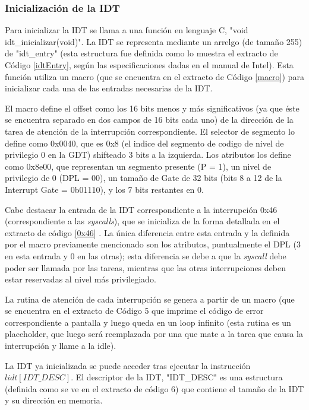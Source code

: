 \subsubsection*{Inicialización de la IDT}

\par Para inicializar la IDT se llama a una funci\'on en lenguaje C, "void idt\_inicializar(void)". La IDT se representa mediante un arrelgo (de tama\~no 255) de "idt\_entry"
(esta estructura fue definida como lo muestra el extracto de C\'odigo \ref{idtEntry}, seg\'un las especificaciones dadas en el manual de Intel). Esta funci\'on utiliza un macro
(que se encuentra en el extracto de C\'odigo \ref{macro}) para inicializar cada una de las entradas necesarias de la IDT. 
\par El macro define el offset como los 16 bits menos y m\'as significativos (ya que \'este se encuentra separado en dos campos de 16 bits cada uno) de la direcci\'on de la tarea de atenci\'on
de la interrupci\'on correspondiente. El selector de segmento lo define como 0x0040, que es 0x8 (el indice del segmento de codigo de nivel de privilegio 0 en la GDT) shifteado 3 bits a la izquierda.
Los atributos los define como 0x8e00, que representan un segmento presente (P = 1), un nivel de privilegio de 0 (DPL = 00), un tama\~no de Gate de 32 bits (bits 8 a 12 de la Interrupt Gate = 0b01110),
y los 7 bits restantes en 0. 
\par Cabe destacar la entrada de la IDT correspondiente a la interrupci\'on 0x46 (correspondiente a las \textit{syscalls}), que se inicializa de la forma detallada en el extracto de c\'odigo \ref{0x46}
. La \'unica diferencia entre esta entrada y la definida por el macro previamente mencionado son los atributos, puntualmente el DPL (3 en esta entrada y 0 en las otras); esta diferencia se debe a que la \textit{syscall} debe poder ser llamada por las tareas, mientras que las otras interrupciones deben estar reservadas al nivel m\'as privilegiado.
\par La rutina de atenci\'on de cada interrupci\'on se genera a partir de un macro (que se encuentra en el extracto de C\'odigo 5 que imprime el c\'odigo de error correspondiente
a pantalla y luego queda en un loop infinito (esta rutina es un placeholder, que luego ser\'a reemplazada por una que mate a la tarea que causa la interrupci\'on y llame a la idle).
\par La IDT ya inicializada se puede acceder tras ejecutar la instrucci\'on $lidt [IDT\_DESC]$. El descriptor de la IDT, "IDT\_DESC" es una estructura (definida como se ve en el extracto de
c\'odigo 6) que contiene el tama\~no de la IDT y su direcci\'on en memoria.

